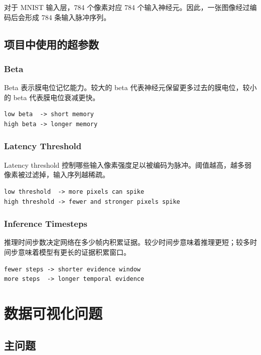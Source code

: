 \documentclass[UTF8,11pt,a4paper]{ctexart}
\begin{document}
对于 MNIST 输入层，784 个像素对应 784 个输入神经元。因此，一张图像经过编码后会形成 784 条输入脉冲序列。

\subsection{项目中使用的超参数}

\subsubsection{Beta}

Beta 表示膜电位记忆能力。较大的 beta 代表神经元保留更多过去的膜电位，较小的 beta 代表膜电位衰减更快。

\begin{lstlisting}
low beta  -> short memory
high beta -> longer memory
\end{lstlisting}

\subsubsection{Latency Threshold}

Latency threshold 控制哪些输入像素强度足以被编码为脉冲。阈值越高，越多弱像素被过滤掉，输入序列越稀疏。

\begin{lstlisting}
low threshold  -> more pixels can spike
high threshold -> fewer and stronger pixels spike
\end{lstlisting}

\subsubsection{Inference Timesteps}

推理时间步数决定网络在多少帧内积累证据。较少时间步意味着推理更短；较多时间步意味着模型有更长的证据积累窗口。

\begin{lstlisting}
fewer steps -> shorter evidence window
more steps  -> longer temporal evidence
\end{lstlisting}

\section{数据可视化问题}

\subsection{主问题}
\end{document}
